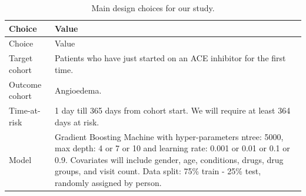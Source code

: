 \documentclass[11pt]{book}
\theoremstyle{definition}
\theoremstyle{definition}
\theoremstyle{definition}
\theoremstyle{remark}
\begin{document}
\begin{longtable}[]{@{}ll@{}}
\caption{\label{tab:plpSummary} Main design choices for our study.}\tabularnewline
\toprule
\begin{minipage}[b]{0.23\columnwidth}\raggedright
Choice\strut
\end{minipage} & \begin{minipage}[b]{0.72\columnwidth}\raggedright
Value\strut
\end{minipage}\tabularnewline
\midrule
\endfirsthead
\toprule
\begin{minipage}[b]{0.23\columnwidth}\raggedright
Choice\strut
\end{minipage} & \begin{minipage}[b]{0.72\columnwidth}\raggedright
Value\strut
\end{minipage}\tabularnewline
\midrule
\endhead
\begin{minipage}[t]{0.23\columnwidth}\raggedright
Target cohort\strut
\end{minipage} & \begin{minipage}[t]{0.72\columnwidth}\raggedright
Patients who have just started on an ACE inhibitor for the first time.\strut
\end{minipage}\tabularnewline
\begin{minipage}[t]{0.23\columnwidth}\raggedright
Outcome cohort\strut
\end{minipage} & \begin{minipage}[t]{0.72\columnwidth}\raggedright
Angioedema.\strut
\end{minipage}\tabularnewline
\begin{minipage}[t]{0.23\columnwidth}\raggedright
Time-at-risk\strut
\end{minipage} & \begin{minipage}[t]{0.72\columnwidth}\raggedright
1 day till 365 days from cohort start. We will require at least 364 days at risk.\strut
\end{minipage}\tabularnewline
\begin{minipage}[t]{0.23\columnwidth}\raggedright
Model\strut
\end{minipage} & \begin{minipage}[t]{0.72\columnwidth}\raggedright
Gradient Boosting Machine with hyper-parameters ntree: 5000, max depth: 4 or 7 or 10 and learning rate: 0.001 or 0.01 or 0.1 or 0.9. Covariates will include gender, age, conditions, drugs, drug groups, and visit count. Data split: 75\% train - 25\% test, randomly assigned by person.\strut
\end{minipage}\tabularnewline
\bottomrule
\end{longtable}
\end{document}
